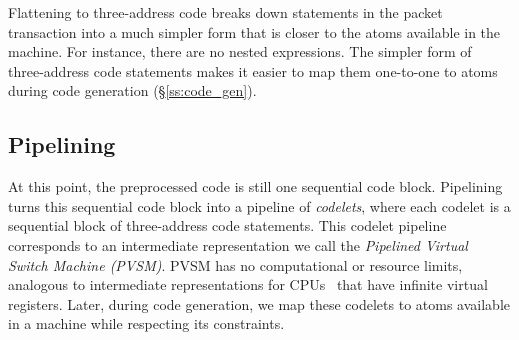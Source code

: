 Flattening to three-address code breaks down
statements in the packet transaction into a much simpler form that is closer
to the atoms available in the \absmachine machine. For instance, there are no
nested expressions. The simpler form of three-address code statements
makes it easier to map them one-to-one to atoms during code generation (\S\ref{ss:code_gen}).


\subsection{Pipelining}
\label{ss:pipelining}
At this point, the preprocessed code is still one sequential code block.
Pipelining turns this sequential code block into a pipeline of
\textit{codelets}, where each codelet is a sequential block of three-address
code statements. This codelet pipeline corresponds to an intermediate
representation we call the \textit{Pipelined Virtual Switch Machine (PVSM)}.
PVSM has no computational or resource limits, analogous to intermediate
representations for CPUs~\cite{llvm} that have infinite virtual
registers. Later, during code generation, we map these codelets to atoms
available in a \absmachine machine while respecting its constraints.


